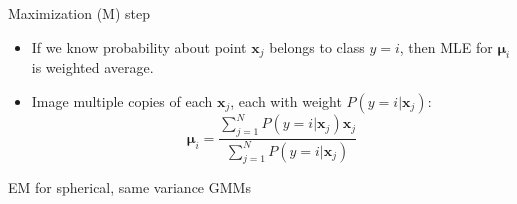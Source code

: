 \documentclass[11.5pt]{beamer}
\begin{document}
\begin{frame}{Maximization (M) step}
\begin{itemize}
\item If we know probability about point $\bm{x}_j$ belongs to class $y=i$, then MLE for $\bm{\mu}_i$ is weighted average.
\item Image multiple copies of each $\bm{x}_j$, each with weight $P(y=i|\bm{x}_j)$:
\begin{equation} \nonumber
\bm{\mu}_i = \frac{\sum_{j=1}^{N}P(y=i|\bm{x}_j)\bm{x}_j}{\sum_{j=1}^{N}P(y=i|\bm{x}_j)}
\end{equation}
\end{itemize}

\begin{frmae}{EM for spherical, same variance GMMs}

\end{frmae}

\end{frame}
\end{document}

